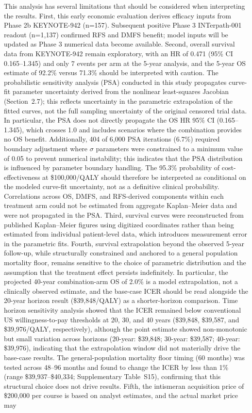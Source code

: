 \documentclass[12pt,a4paper]{article}
\begin{document}
This analysis has several limitations that should be considered when interpreting the results. First, this early economic evaluation derives efficacy inputs from Phase 2b \mbox{KEYNOTE-942} (n=157). Subsequent positive Phase 3 \mbox{INTerpath-001} readout (n=1,137) confirmed RFS and DMFS benefit; model inputs will be updated as Phase 3 numerical data become available. Second, overall survival data from \mbox{KEYNOTE-942} remain exploratory, with an HR of 0.471 (95\% CI 0.165--1.345) and only 7 events per arm at the 5-year analysis, and the 5-year OS estimate of 92.2\% versus 71.3\% should be interpreted with caution. The probabilistic sensitivity analysis (PSA) conducted in this study propagates curve-fit parameter uncertainty derived from the nonlinear least-squares Jacobian (Section~2.7); this reflects uncertainty in the parametric extrapolation of the fitted curves, not the full sampling uncertainty of the original censored trial data. In particular, the PSA does not directly propagate the OS HR 95\% CI (0.165--1.345), which crosses 1.0 and includes scenarios where the combination provides no OS benefit. Additionally, 404 of 6,000 PSA iterations (6.7\%) required boundary adjustment where $\sigma$ parameters were constrained to a minimum value of 0.05 to prevent numerical instability; this indicates that the PSA distribution is influenced by parameter boundary handling. The 95.3\% probability of cost-effectiveness at \$100,000/QALY should therefore be interpreted as conditional on the modeled curve-fit uncertainty, not as a definitive clinical probability. Correlations across OS, DMFS, and RFS-derived components within each treatment arm could not be estimated from aggregate Kaplan--Meier data and were not propagated in the PSA. Third, survival curves were reconstructed from published Kaplan--Meier figures using digitized coordinates rather than being estimated from individual patient-level data, which introduces measurement error in the parametric fits. Fourth, survival extrapolation beyond the observed 5-year follow-up, while structurally constrained and anchored to a general population mortality floor, remains sensitive to the choice of parametric distribution and the assumption that the treatment effect persists indefinitely. In particular, the projected 40-year combination-arm OS of 2.0\% is a model extrapolation, not a clinically observed estimate, and the base-case ICER should be read alongside the 20-year horizon result (\$39,848/QALY) as a shorter-horizon comparison. Time horizon sensitivity analysis showed that the ICER remained below conventional US willingness-to-pay thresholds at 20, 30, and 40 years (\$39,848, \$39,587, and \$39,976/QALY, respectively), although the point estimate showed non-monotonic but small variation across horizons (20-year: \$39,848; 30-year: \$39,587; 40-year: \$39,976), indicating that the extrapolation window did not materially drive the base-case results. The general-population mortality floor timing (60 months) was tested across 48--96 months and found to change the ICER by less than 1\% (range \$39,937--\$40,334; Supplementary Table~S15), confirming that this structural choice does not drive results. Fifth, the intismeran acquisition price of \$200,000 per course is based on analyst estimates, and the actual market price may 
\end{document}
